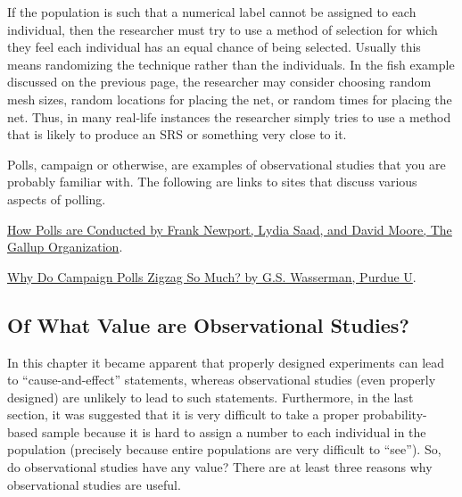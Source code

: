 \documentclass[10pt,openany]{book}\usepackage[]{graphicx}\usepackage[]{color}
\begin{document}
\vspace{-12pt}

If the population is such that a numerical label cannot be assigned to each individual, then the researcher must try to use a method of selection for which they feel each individual has an equal chance of being selected.  Usually this means randomizing the technique rather than the individuals.  In the fish example discussed on the previous page, the researcher may consider choosing random mesh sizes, random locations for placing the net, or random times for placing the net.  Thus, in many real-life instances the researcher simply tries to use a method that is likely to produce an SRS or something very close to it.


Polls, campaign or otherwise, are examples of observational studies that you are probably familiar with.  The following are links to sites that discuss various aspects of polling.
\begin{Itemize}
  \item \href{http://media.gallup.com/PDF/FAQ/HowArePolls.pdf}{How Polls are Conducted by Frank Newport, Lydia Saad, and David Moore, The Gallup Organization}.
  \item \href{http://www2.psych.purdue.edu/~codelab/Invalid.Polls.html}{Why Do Campaign Polls Zigzag So Much? by G.S. Wasserman, Purdue U}.
\end{Itemize}

\vspace{-12pt}
\subsection{Of What Value are Observational Studies?}
\vspace{-12pt}
In this chapter it became apparent that properly designed experiments can lead to ``cause-and-effect'' statements, whereas observational studies (even properly designed) are unlikely to lead to such statements.  Furthermore, in the last section, it was suggested that it is very difficult to take a proper probability-based sample because it is hard to assign a number to each individual in the population (precisely because entire populations are very difficult to ``see'').  So, do observational studies have any value?  There are at least three reasons why observational studies are useful.
\end{document}
